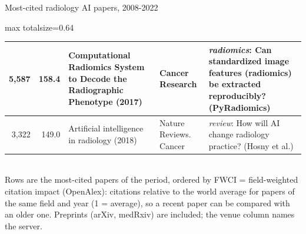 \documentclass[aspectratio=169]{beamer}
\begin{document}
\begin{frame}[category=Journals/Preprints]{Most-cited radiology AI papers, 2008-2022}
\begin{adjustbox}{max totalsize={\textwidth}{0.64\textheight}}
\begin{tabular}{|r|r|>{\raggedright\arraybackslash}p{}|>{\raggedright\arraybackslash}p{}|>{\raggedright\arraybackslash}p{}|}
5,587 & 158.4 & Computational Radiomics System to Decode the Radiographic Phenotype (2017) & Cancer Research & \textit{radiomics}: Can standardized image features (radiomics) be extracted reproducibly? (PyRadiomics) \\ \hline
3,322 & 149.0 & Artificial intelligence in radiology (2018) & Nature Reviews. Cancer & \textit{review}: How will AI change radiology practice? (Hosny et al.) \\ \hline
\end{tabular}
\end{adjustbox}
\\[1pt]
{\tiny Rows are the most-cited papers of the period, ordered by FWCI = field-weighted citation impact (OpenAlex): citations relative to the world average for papers of the same field and year (1 = average), so a recent paper can be compared with an older one. Preprints (arXiv, medRxiv) are included; the venue column names the server.}
\end{frame}
\end{document}
